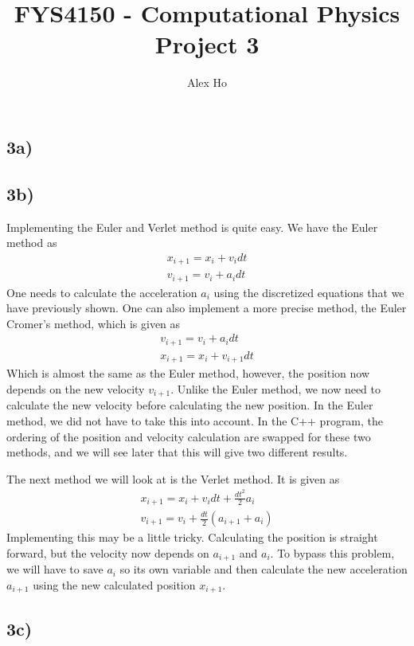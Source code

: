 \documentclass[12pt]{article}
\author{Alex Ho}
\title{FYS4150 - Computational Physics \\ Project 3}
\begin{document}
\maketitle
\subsection*{3a)}
\subsection*{3b)}
Implementing the Euler and Verlet method is quite easy. We have the Euler method as
\begin{align*}
x_{i+1} = x_i + v_idt \\
v_{i+1} = v_i + a_idt
\end{align*}
One needs to calculate the acceleration $a_i$ using the discretized equations that we have previously shown. One can also implement a more precise method, the Euler Cromer's method, which is given as
\begin{align*}
v_{i+1} = v_i + a_idt \\
x_{i+1} = x_i + v_{i+1}dt
\end{align*}
Which is almost the same as the Euler method, however, the position now depends on the new velocity $v_{i+1}$. Unlike the Euler method, we now need to calculate the new velocity before calculating the new position. In the Euler method, we did not have to take this into account. In the C++ program, the ordering of the position and velocity calculation are swapped for these two methods, and we will see later that this will give two different results.

The next method we will look at is the Verlet method. It is given as
\begin{align*}
x_{i+1} = x_i + v_idt + \frac{dt^2}{2}a_i\\
v_{i+1} = v_i + \frac{dt}{2}\left(a_{i+1} + a_i \right)
\end{align*}
Implementing this may be a little tricky. Calculating the position is straight forward, but the velocity now depends on $a_{i+1}$ and $a_i$. To bypass this problem, we will have to save $a_i$ so its own variable and then calculate the new acceleration $a_{i+1}$ using the new calculated position $x_{i+1}$. 

\subsection*{3c)}
\end{document}

